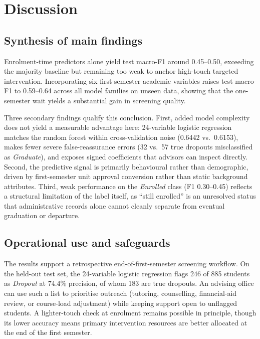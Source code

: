 \documentclass[11pt,a4paper]{article}
\newcommand{\Dropout}{\textit{Dropout}}
\newcommand{\Enrolled}{\textit{Enrolled}}
\newcommand{\Graduate}{\textit{Graduate}}
\begin{document}
\section{Discussion}

\subsection{Synthesis of main findings}

Enrolment-time predictors alone yield test macro-F1 around 0.45--0.50, exceeding the majority
baseline but remaining too weak to anchor high-touch targeted intervention. Incorporating six
first-semester academic variables raises test macro-F1 to 0.59--0.64 across all model families on
unseen data, showing that the one-semester wait yields a substantial gain in screening quality.

Three secondary findings qualify this conclusion. First, added model complexity does not yield a
measurable advantage here: 24-variable logistic regression matches the random forest within
cross-validation noise (0.6442 vs.\ 0.6153), makes fewer severe false-reassurance errors (32 vs.\ 57
true dropouts misclassified as \Graduate{}), and exposes signed coefficients that advisors can
inspect directly. Second, the predictive signal is primarily behavioural rather than demographic,
driven by first-semester unit approval conversion rather than static background attributes. Third,
weak performance on the \Enrolled{} class (F1 0.30--0.45) reflects a structural limitation of the
label itself, as ``still enrolled'' is an unresolved status that administrative records alone cannot
cleanly separate from eventual graduation or departure.

\subsection{Operational use and safeguards}

The results support a retrospective end-of-first-semester screening workflow. On the held-out test
set, the 24-variable logistic regression flags 246 of 885 students as \Dropout{} at 74.4\% precision,
of whom 183 are true dropouts. An advising office can use such a list to prioritise outreach
(tutoring, counselling, financial-aid review, or course-load adjustment) while keeping support open
to unflagged students. A lighter-touch check at enrolment remains possible in principle, though its
lower accuracy means primary intervention resources are better allocated at the end of the first
semester.
\end{document}

